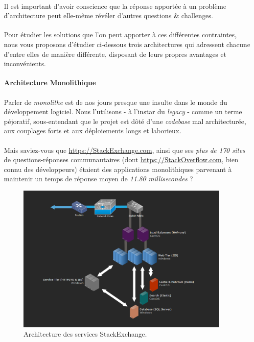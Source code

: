 \paragraph{} Il est important d'avoir conscience que la réponse apportée à un problème d'architecture peut elle-même révéler 
d'autres questions \& challenges.

\paragraph{} Pour étudier les solutions que l'on peut apporter à ces différentes contraintes, nous vous proposons d'étudier
ci-dessous trois architectures qui adressent chacune d'entre elles de manière différente, disposant de leurs propres
avantages et inconvénients.


\paragraph{Architecture Monolithique}

\paragraph{} Parler de \emph{monolithe} est de nos jours presque une insulte dans le monde du développement logiciel. Nous 
l'utilisons - à l'instar du \emph{legacy} - comme un terme péjoratif, sous-entendant que le projet est dôté d'une \emph{codebase}
mal architecturée, aux couplages forts et aux déploiements longs et laborieux.

\paragraph{} Mais saviez-vous que \url{https://StackExchange.com}, ainsi que ses \emph{plus de 170 sites} de questions-réponses
communautaires (dont \url{https://StackOverflow.com}, bien connu des développeurs) étaient des applications monolithiques 
parvenant à maintenir un temps de réponse moyen de \emph{11.80 millisecondes} \cite{Microservices7} ?

\begin{figure}[h]
    \centering
    \includegraphics[width=400px]{chapters/02/images/stackexchange.png}
    \caption{\label{stackexchange_architecture} Architecture des services StackExchange.}
\end{figure}

